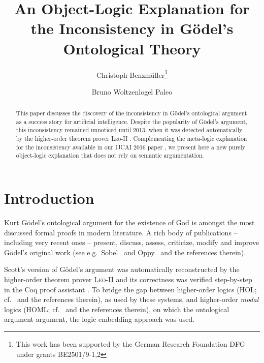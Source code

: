 \documentclass{llncs}
\begin{document}
\title{An Object-Logic Explanation for the Inconsistency in G\"odel's Ontological Theory}
\author{Christoph Benzm\"uller\thanks{This work has been supported by
    the German Research Foundation DFG under grants BE2501/9-1,2} \and Bruno Woltzenlogel Paleo 
}


\maketitle            



\begin{abstract}
  This paper discusses the discovery of the 
  inconsistency in G\"odel's
  ontological argument as a success story for artificial
  intelligence. Despite the popularity of G\"odel's argument, this
  inconsistency remained unnoticed until 2013, 
  when it was detected automatically by the 
  higher-order theorem prover \textsc{Leo-II} \cite{ECAI2014}. Complementing the meta-logic explanation for the inconsistency available in our IJCAI 2016 paper \cite{C55}, we present here a new purely object-logic explanation that does not rely on semantic argumentation.
  
\end{abstract}




\section{Introduction}\label{sec:introduction}
Kurt G\"{o}del's ontological
argument for the existence of God \cite{GoedelNotes,ScottNotes} is
amongst the most discussed formal proofs in modern literature. A rich
body of publications -- including very recent ones -- present,
discuss, assess, criticize, modify and improve G\"{o}del's original
work (see e.g.~Sobel~\cite{sobel2004logic} and Oppy~\cite{sep-ontological-arguments} and the
references therein). 

Scott's version of G\"odel's argument was automatically reconstructed by the higher-order theorem prover \textsc{Leo-II} \cite{C40} and its correctness was verified step-by-step in the Coq proof assistant \cite{CSR}. To bridge the gap between higher-order logics (HOL; cf.~\cite{andrewsSEP} and the references
therein), as used by these systems, and higher-order \emph{modal} logics (HOML; cf.~\cite{homl} and the
references therein), on which the ontological argument argument, the logic embedding approach \cite{J23,C40} was used.
\end{document}
